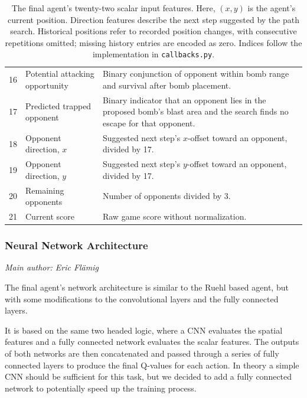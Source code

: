 \documentclass[11pt,a4paper]{article}
\newcommand{\contributionauthor}[1]{{\small\textit{Main author: #1}\par}}
\begin{document}
\begin{table}[htbp]
\begin{tabularx}{\textwidth}{@{}r>{\raggedright\arraybackslash}p{4.2cm}Y@{}}
16 & Potential attacking opportunity & Binary conjunction of opponent within bomb range and survival after bomb placement. \\
17 & Predicted trapped opponent & Binary indicator that an opponent lies in the proposed bomb's blast area and the search finds no escape for that opponent. \\
18 & Opponent direction, $x$ & Suggested next step's $x$-offset toward an opponent, divided by 17. \\
19 & Opponent direction, $y$ & Suggested next step's $y$-offset toward an opponent, divided by 17. \\
20 & Remaining opponents & Number of opponents divided by 3. \\
21 & Current score & Raw game score without normalization. \\
\bottomrule
\end{tabularx}
\caption{The final agent's twenty-two scalar input features.
Here, $(x,y)$ is the agent's current position.
Direction features describe the next step suggested by the path search.
Historical positions refer to recorded position changes, with consecutive
repetitions omitted; missing history entries are encoded as zero.
Indices follow the implementation in \texttt{callbacks.py}.}
\label{tab:final-agent-scalar-features}
\end{table}

\subsubsection{Neural Network Architecture}
\contributionauthor{Eric Flämig}

The final agent's network architecture is similar to the Ruehl based agent, but with some modifications to the convolutional layers and the fully connected layers.

It is based on the same two headed logic, where a CNN evaluates the spatial features and a fully connected network evaluates the scalar features. The outputs of both networks are then concatenated and passed through a series of fully connected layers to produce the final Q-values for each action. In theory a simple CNN should be sufficient for this task, but we decided to add a fully connected network to potentially speed up the training process.
\end{document}

